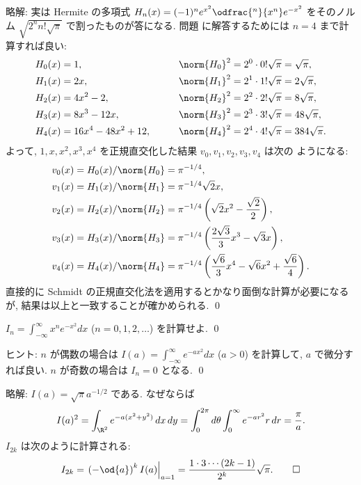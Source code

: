 \documentclass[12pt,twoside]{jarticle}
\newcommand\commentout[1]{#1}
\newcommand\commentout[1]{}
\begin{document}
\commentout{
\medskip
\noindent
略解: 実は Hermite の多項式 $H_n(x)=(-1)^ne^{x^2}\odfrac{^n}{x^n}e^{-x^2}$ 
をそのノルム $\sqrt{2^nn!\sqrt{\pi}}$ で割ったものが答になる. 
問題 \qref{q:Hermite-polyn-2} に解答するためには $n=4$ まで計算すれば良い:
\begin{alignat*}{2}
  & H_0(x) = 1, &
  \qquad
  & \norm{H_0}^2 = 2^0\cdot0!\sqrt{\pi} = \sqrt{\pi},
  \\
  & H_1(x) = 2x, &
  \qquad
  & \norm{H_1}^2 = 2^1\cdot1!\sqrt{\pi} = 2\sqrt{\pi},
  \\
  & H_2(x) = 4x^2 - 2, &
  \qquad
  & \norm{H_2}^2 = 2^2\cdot2!\sqrt{\pi} = 8\sqrt{\pi},
  \\
  & H_3(x) = 8x^3 - 12x, &
  \qquad
  & \norm{H_3}^2 = 2^3\cdot3!\sqrt{\pi} = 48\sqrt{\pi},
  \\
  & H_4(x) = 16x^4 - 48x^2 + 12, &
  \qquad
  & \norm{H_4}^2 = 2^4\cdot4!\sqrt{\pi} = 384\sqrt{\pi}.
\end{alignat*}
よって, $1,x,x^2,x^3,x^4$ を正規直交化した結果 $v_0,v_1,v_2,v_3,v_4$ は次の
ようになる:
\begin{align*}
  &
  v_0(x) = H_0(x)/\norm{H_0} = \pi^{-1/4},
  \\ &
  v_1(x) = H_1(x)/\norm{H_1} =\pi^{-1/4}\sqrt{2}x,
  \\ &
  v_2(x) = H_2(x)/\norm{H_2} 
  =\pi^{-1/4}\left(\sqrt{2}x^2 - \frac{\sqrt{2}}{2}\right),
  \\ &
  v_3(x) = H_3(x)/\norm{H_3} 
  =\pi^{-1/4}\left( \frac{2\sqrt{3}}{3}x^3 - \sqrt{3}x\right),
  \\ &
  v_4(x) = H_4(x)/\norm{H_4} 
  =\pi^{-1/4}\left(
    \frac{\sqrt{6}}{3}x^4 - \sqrt{6}x^2 + \frac{\sqrt{6}}{4}
  \right).
\end{align*}
直接的に Schmidt の正規直交化法を適用するとかなり面倒な計算が必要になるが, 
結果は以上と一致することが確かめられる.
\qed
}


\begin{question}[10点]
\label{q:In}
  $I_n=\int_{-\infty}^\infty x^n e^{-x^2}dx$ 
  \enspace ($n=0,1,2,\ldots$) を計算せよ.
  \qed
\end{question}

\medskip
\noindent
ヒント: $n$ が偶数の場合は $I(a)=\int_{-\infty}^\infty e^{-ax^2}dx$ 
\enspace ($a>0$) を計算して, $a$ で微分すれば良い.  
$n$ が奇数の場合は $I_n = 0$ となる.
\qed

\commentout{
\medskip
\noindent
略解: $I(a) = \sqrt{\pi} a^{-1/2}$ である. なぜならば
\begin{equation*}
  I(a)^2 = \int_{\R^2} e^{-a(x^2+y^2)}\,dx\,dy
  = \int_0^{2\pi}d\theta \int_0^\infty e^{-ar^2} r\,dr
  = \frac{\pi}{a}.
\end{equation*}
$I_{2k}$ は次のように計算される:
\begin{equation*}
  I_{2k} = \left.\left(-\od{a}\right)^k I(a)\right|_{a=1}
  = \frac{1\cdot3\cdots(2k-1)}{2^k}\sqrt{\pi}.
\qed
\end{equation*}
}
\end{document}
